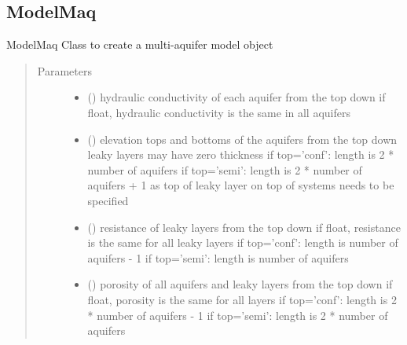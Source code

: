 \documentclass[letterpaper,10pt,english]{sphinxmanual}
\begin{document}
\subsection{ModelMaq}
\label{\detokenize{models/modelmaq:modelmaq}}\label{\detokenize{models/modelmaq::doc}}

\begin{fulllineitems}
\label{\detokenize{models/modelmaq:timml.model.ModelMaq}}
ModelMaq Class to create a multi-aquifer model object
\begin{quote}\begin{description}
\item[{Parameters}] \leavevmode\begin{itemize}
\item {} 
 (\sphinxstyleliteralemphasis{, }) \textendash{} hydraulic conductivity of each aquifer from the top down
if float, hydraulic conductivity is the same in all aquifers

\item {} 
 () \textendash{} elevation tops and bottoms of the aquifers from the top down
leaky layers may have zero thickness
if top=’conf’: length is 2 * number of aquifers
if top=’semi’: length is 2 * number of aquifers + 1 as top
of leaky layer on top of systems needs to be specified

\item {} 
 (\sphinxstyleliteralemphasis{, }) \textendash{} resistance of leaky layers from the top down
if float, resistance is the same for all leaky layers
if top=’conf’: length is number of aquifers - 1
if top=’semi’: length is number of aquifers

\item {} 
 (\sphinxstyleliteralemphasis{, }) \textendash{} porosity of all aquifers and leaky layers from the top down
if float, porosity is the same for all layers
if top=’conf’: length is 2 * number of aquifers - 1
if top=’semi’: length is 2 * number of aquifers


\end{itemize}
\end{description}
\end{quote}
\end{fulllineitems}
\end{document}
